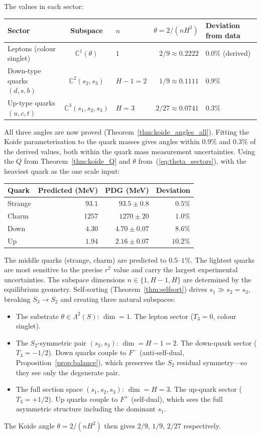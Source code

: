 \documentclass[11pt,a4paper]{article}
\let\hline\midrule
\theoremstyle{definition}
\theoremstyle{remark}
\newcommand{\C}{\mathbb{C}}
\begin{document}
The values in each sector:

\begin{center}
\begin{tabular}{lclrl}
\hline
Sector & Subspace & $n$ & $\theta = 2/(nH^2)$ & Deviation from data \\
\hline
Leptons (colour singlet) & $\C^1(\theta)$ & $1$ & $2/9\approx 0.2222$ & $0.0\%$ (derived) \\
Down-type quarks $(d,s,b)$ & $\C^2(s_2,s_3)$ & $H-1=2$ & $1/9\approx 0.1111$ & $0.9\%$ \\
Up-type quarks $(u,c,t)$ & $\C^3(s_1,s_2,s_3)$ & $H=3$ & $2/27\approx 0.0741$ & $0.3\%$ \\
\hline
\end{tabular}
\end{center}

All three angles are now proved (Theorem~\ref{thm:koide_angles_all}). Fitting the Koide parameterisation to the quark masses gives angles within $0.9\%$ and $0.3\%$ of the derived values, both within the quark mass measurement uncertainties. Using the $Q$ from Theorem~\ref{thm:koide_Q} and $\theta$ from~(\ref{eq:theta_sectors}), with the heaviest quark as the one scale input:

\begin{center}
\begin{tabular}{lrrr}
\hline
Quark & Predicted (MeV) & PDG (MeV) & Deviation \\
\hline
Strange & $93.1$ & $93.5\pm 0.8$ & $0.5\%$ \\
Charm & $1257$ & $1270\pm 20$ & $1.0\%$ \\
Down & $4.30$ & $4.70\pm 0.07$ & $8.6\%$ \\
Up & $1.94$ & $2.16\pm 0.07$ & $10.2\%$ \\
\hline
\end{tabular}
\end{center}

The middle quarks (strange, charm) are predicted to $0.5$--$1\%$. The lightest quarks are most sensitive to the precise $r^2$ value and carry the largest experimental uncertainties. The subspace dimensions $n\in\{1,H\!-\!1,H\}$ are determined by the equilibrium geometry. Self-sorting (Theorem~\ref{thm:selfsort}) drives $s_1\gg s_2=s_3$, breaking $S_3\to S_2$ and creating three natural subspaces:
\begin{itemize}[nosep]
\item The substrate $\theta\in\Lambda^2(S)$: $\dim=1$. The lepton sector ($T_3=0$, colour singlet).
\item The $S_2$-symmetric pair $(s_2,s_3)$: $\dim=H\!-\!1=2$. The down-quark sector ($T_3=-1/2$). Down quarks couple to $F^-$ (anti-self-dual, Proposition~\ref{prop:balance}), which preserves the $S_2$ residual symmetry---so they see only the degenerate pair.
\item The full section space $(s_1,s_2,s_3)$: $\dim=H=3$. The up-quark sector ($T_3=+1/2$). Up quarks couple to $F^+$ (self-dual), which sees the full asymmetric structure including the dominant $s_1$.
\end{itemize}
The Koide angle $\theta=2/(nH^2)$ then gives $2/9$, $1/9$, $2/27$ respectively.
\end{document}
